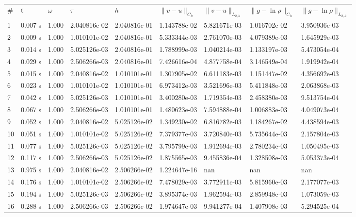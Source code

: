 \documentclass[12pt]{article}
\begin{document}
\begin{center}
\begin{tabular}{lllllllll}
\# & t & $\omega$ & $\tau$ & $h$ & $\|v - u\|_{C_h}$ & $\|v - u\|_{L_{2,h}}$ & $\|g - \ln\rho\|_{C_h}$ & $\|g - \ln\rho\|_{L_{2,h}}$ \\

1&      0.007 s&      1.000&      2.040816e-02&      2.040816e-01&      1.143788e-02&      5.821671e-03&      1.016702e-02&      3.950936e-03\\
2&      0.009 s&      1.000&      1.010101e-02&      2.040816e-01&      5.333344e-03&      2.761070e-03&      4.079389e-03&      1.645929e-03\\
3&      0.014 s&      1.000&      5.025126e-03&      2.040816e-01&      1.788999e-03&      1.040214e-03&      1.133197e-03&      5.473054e-04\\
4&      0.029 s&      1.000&      2.506266e-03&      2.040816e-01&      7.426616e-04&      4.877758e-04&      3.146549e-04&      1.919942e-04\\
5&      0.015 s&      1.000&      2.040816e-02&      1.010101e-01&      1.307905e-02&      6.611183e-03&      1.151447e-02&      4.356692e-03\\
6&      0.023 s&      1.000&      1.010101e-02&      1.010101e-01&      6.973412e-03&      3.521696e-03&      5.411848e-03&      2.063868e-03\\
7&      0.042 s&      1.000&      5.025126e-03&      1.010101e-01&      3.400280e-03&      1.719354e-03&      2.458380e-03&      9.513754e-04\\
8&      0.067 s&      1.000&      2.506266e-03&      1.010101e-01&      1.480623e-03&      7.594888e-04&      1.006883e-03&      4.049073e-04\\
9&      0.052 s&      1.000&      2.040816e-02&      5.025126e-02&      1.349230e-02&      6.816782e-03&      1.184267e-02&      4.438594e-03\\
10&      0.051 s&      1.000&      1.010101e-02&      5.025126e-02&      7.379377e-03&      3.720840e-03&      5.735644e-03&      2.157804e-03\\
11&      0.077 s&      1.000&      5.025126e-03&      5.025126e-02&      3.795799e-03&      1.912694e-03&      2.780234e-03&      1.050495e-03\\
12&      0.117 s&      1.000&      2.506266e-03&      5.025126e-02&      1.875565e-03&      9.455836e-04&      1.328508e-03&      5.053373e-04\\
13&      0.975 s&      1.000&      2.040816e-02&      2.506266e-02&      1.224647e-16&      nan&      nan&      nan\\
14&      0.176 s&      1.000&      1.010101e-02&      2.506266e-02&      7.478029e-03&      3.772911e-03&      5.815960e-03&      2.177077e-03\\
15&      0.194 s&      1.000&      5.025126e-03&      2.506266e-02&      3.895374e-03&      1.962594e-03&      2.859948e-03&      1.073059e-03\\
16&      0.288 s&      1.000&      2.506266e-03&      2.506266e-02&      1.974647e-03&      9.941277e-04&      1.407908e-03&      5.294525e-04\\
\end{tabular}
\end{center}
\end{document}
